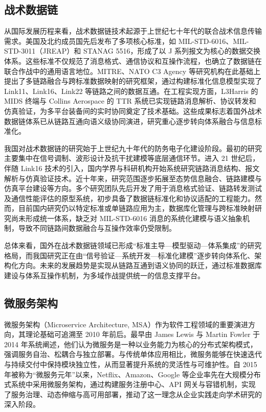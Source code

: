 \subsection{战术数据链}

从国际发展历程来看，战术数据链技术起源于上世纪七十年代的联合战术信息传输需求。美国及北约成员国先后发布了多项核心标准，如 MIL-STD-6016、MIL-STD-3011（JREAP）和 STANAG 5516\cite{丁丁2019,马建强2020}，形成了以 J 系列报文为核心的数据交换体系。这些标准不仅规范了消息格式、通信协议和互操作流程，也确立了数据链在联合作战中的通用语言地位。MITRE、NATO C3 Agency 等研究机构在此基础上提出了多链路融合与跨标准数据映射的研究框架\cite{程方昊2025,陈利玲2025}，通过构建标准化信息模型实现了 Link11、Link16、Link22 等链路之间的数据互通。在工程实现方面，L3Harris 的 MIDS 终端与 Collins Aerospace 的 TTR 系统已实现链路消息解析、协议转发和仿真验证，为多平台装备间的实时协同奠定了技术基础。这些成果标志着国外战术数据链体系已从链路互通向语义级协同演进，研究重心逐步转向体系融合与信息标准化。

我国对战术数据链的研究始于上世纪九十年代的防务电子化建设阶段。最初的研究主要集中在信号调制、波形设计及抗干扰建模等底层通信环节\cite{wray_sheppard_1986_jtids_nav,ranger1996_jn}。进入 21 世纪后，伴随 {Link16} 技术的引入，国内学界与科研机构开始系统研究链路消息结构、报文解析与仿真验证技术\cite{fried1978_taes,fried1984_navigation}。近十年来，研究范围逐步拓展至态势信息融合、链路建模与仿真平台建设等方向\cite{doherty1988_jn,L3Harris_MIDS_LVT_2025}。多个研究团队先后开发了用于消息格式验证、链路转发测试及通信性能评估的原型系统，初步具备了数据链标准化和协议适配的工程能力。然而，目前国内研究仍以特定标准或单链路应用为主，数据库化管理与跨标准映射研究尚未形成统一体系，缺乏对 MIL-STD-6016 消息的系统化建模与语义抽象机制，导致不同链路间数据融合与互操作效率仍受限制。

总体来看，国外在战术数据链领域已形成“标准主导—模型驱动—体系集成”的研究格局，而我国研究正在由“信号验证—系统开发—标准化建模”逐步转向体系化、架构化方向。未来的发展趋势是实现从链路互通到语义协同的跃迁，通过标准数据库建设与体系互操作机制，为多域作战提供统一的信息支撑平台。

\subsection{微服务架构}

微服务架构（Microservice Architecture, MSA）作为软件工程领域的重要演进方向，其理论基础可追溯至 2010 年前后。最早由 James Lewis 与 Martin Fowler 于 2014 年系统阐述，他们认为微服务是一种以业务能力为核心的分布式架构模式，强调服务自治、松耦合与独立部署。与传统单体应用相比，微服务能够在快速迭代与持续交付中保持模块独立性，从而显著提升系统的灵活性与可维护性。自 2015 年被称为“微服务元年”以来，Netflix、Amazon、Google 等企业率先在大规模分布式系统中采用微服务架构，通过构建服务注册中心、API 网关与容错机制，实现了服务治理、动态伸缩与高可用部署，推动了这一理念从企业实践走向学术研究的深入阶段。

